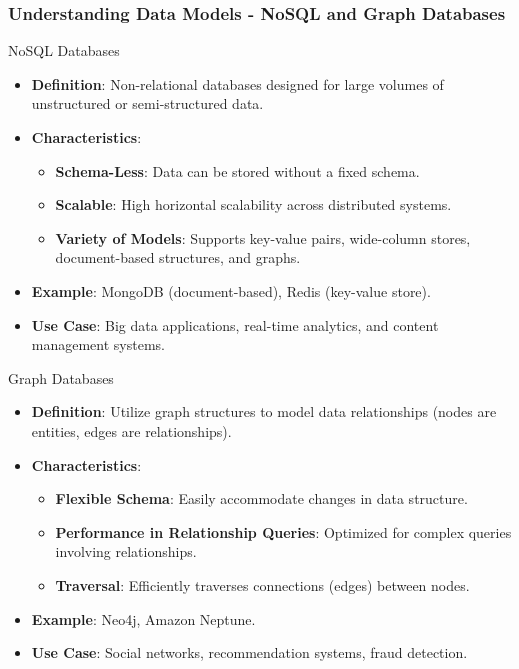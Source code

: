 \documentclass[aspectratio=169]{beamer}
\begin{document}
\begin{frame}[fragile]
    \frametitle{Understanding Data Models - NoSQL and Graph Databases}
    \begin{block}{NoSQL Databases}
        \begin{itemize}
            \item \textbf{Definition}: Non-relational databases designed for large volumes of unstructured or semi-structured data.
            \item \textbf{Characteristics}:
                \begin{itemize}
                    \item \textbf{Schema-Less}: Data can be stored without a fixed schema.
                    \item \textbf{Scalable}: High horizontal scalability across distributed systems.
                    \item \textbf{Variety of Models}: Supports key-value pairs, wide-column stores, document-based structures, and graphs.
                \end{itemize}
            \item \textbf{Example}: MongoDB (document-based), Redis (key-value store).
            \item \textbf{Use Case}: Big data applications, real-time analytics, and content management systems.
        \end{itemize}
    \end{block}

    \begin{block}{Graph Databases}
        \begin{itemize}
            \item \textbf{Definition}: Utilize graph structures to model data relationships (nodes are entities, edges are relationships).
            \item \textbf{Characteristics}:
                \begin{itemize}
                    \item \textbf{Flexible Schema}: Easily accommodate changes in data structure.
                    \item \textbf{Performance in Relationship Queries}: Optimized for complex queries involving relationships.
                    \item \textbf{Traversal}: Efficiently traverses connections (edges) between nodes.
                \end{itemize}
            \item \textbf{Example}: Neo4j, Amazon Neptune.
            \item \textbf{Use Case}: Social networks, recommendation systems, fraud detection.
        \end{itemize}
    \end{block}
\end{frame}
\end{document}
